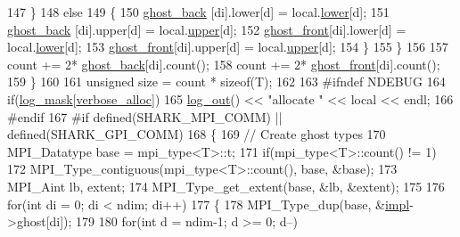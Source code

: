 \begin{DoxyCode}
147             \}
148             \textcolor{keywordflow}{else}
149             \{
150                 \hyperlink{classshark_1_1ndim_1_1_global_array_a97eb47a8cd80d98627706e673259a310}{ghost\_back} [di].lower[d] = local.\hyperlink{structshark_1_1ndim_1_1coords__range_a46cae2c424d7b20f911a970c92581b19}{lower}[d];
151                 \hyperlink{classshark_1_1ndim_1_1_global_array_a97eb47a8cd80d98627706e673259a310}{ghost\_back} [di].upper[d] = local.\hyperlink{structshark_1_1ndim_1_1coords__range_ae0101e4bb3ecadf1faa0fc786dfb05db}{upper}[d];
152                 \hyperlink{classshark_1_1ndim_1_1_global_array_a48ce861293f294f003ef16ebd49eb942}{ghost\_front}[di].lower[d] = local.\hyperlink{structshark_1_1ndim_1_1coords__range_a46cae2c424d7b20f911a970c92581b19}{lower}[d];
153                 \hyperlink{classshark_1_1ndim_1_1_global_array_a48ce861293f294f003ef16ebd49eb942}{ghost\_front}[di].upper[d] = local.\hyperlink{structshark_1_1ndim_1_1coords__range_ae0101e4bb3ecadf1faa0fc786dfb05db}{upper}[d];
154             \}
155                 \}
156 
157                 count += 2* \hyperlink{classshark_1_1ndim_1_1_global_array_a97eb47a8cd80d98627706e673259a310}{ghost\_back}[di].count();
158                 count += 2* \hyperlink{classshark_1_1ndim_1_1_global_array_a48ce861293f294f003ef16ebd49eb942}{ghost\_front}[di].count();
159         \}
160 
161     \textcolor{keywordtype}{unsigned} size = count * \textcolor{keyword}{sizeof}(T);
162 
163 \textcolor{preprocessor}{#ifndef NDEBUG}
164     \textcolor{keywordflow}{if}(\hyperlink{namespaceshark_a110e03e8104b06caef346fcc25621aa9}{log\_mask}[\hyperlink{namespaceshark_a067e8941bdd5f38f5ab2e49920787b9d}{verbose\_alloc}])
165         \hyperlink{classshark_1_1ndim_1_1_global_array_ae56b93f4ac19003102749015275a6d0c}{log\_out}() << \textcolor{stringliteral}{"allocate "} << local << endl;
166 \textcolor{preprocessor}{#endif}
167 \textcolor{preprocessor}{#if defined(SHARK\_MPI\_COMM) || defined(SHARK\_GPI\_COMM)}
168     \{
169         \textcolor{comment}{// Create ghost types}
170         MPI\_Datatype base = mpi\_type<T>::t;
171         \textcolor{keywordflow}{if}(mpi\_type<T>::count() != 1)
172             MPI\_Type\_contiguous(mpi\_type<T>::count(), base, &base);
173         MPI\_Aint lb, extent;
174         MPI\_Type\_get\_extent(base, &lb, &extent);
175 
176         \textcolor{keywordflow}{for}(\textcolor{keywordtype}{int} di = 0; di < ndim; di++)
177         \{
178             MPI\_Type\_dup(base, &\hyperlink{classshark_1_1ndim_1_1_global_array_a70684121da4badfef791c15d7076282f}{impl}->ghost[di]);
179 
180             \textcolor{keywordflow}{for}(\textcolor{keywordtype}{int} d = ndim-1; d >= 0; d--)

\end{DoxyCode}
